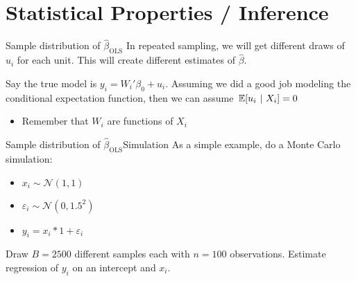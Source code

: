 \documentclass[aspectratio=169,t,11pt,table]{beamer}
\begin{document}
% 



\section{Statistical Properties / Inference}

\begin{frame}{Sample distribution of $\hat{\beta}_{\text{OLS}}$}
  In repeated sampling, we will get different draws of $u_i$ for each unit. This will create different estimates of $\hat{\beta}$. 

  \bigskip
  Say the true model is $y_i = W_i' \beta_0 + u_i$. Assuming we did a good job modeling the conditional expectation function, then we can assume $\expec{u_i}{X_i} = 0$
  \begin{itemize}
    \item Remember that $W_i$ are functions of $X_i$
  \end{itemize}
\end{frame}

\begin{frame}{Sample distribution of $\hat{\beta}_{\text{OLS}}$}{Simulation}
  As a simple example, do a Monte Carlo simulation:
  \begin{itemize}
    \item $x_i \sim \mathcal{N}(1, 1)$
    \item $\varepsilon_i \sim \mathcal{N}(0, 1.5^2)$
    \item $y_i = x_i * 1 + \varepsilon_i$
  \end{itemize} 

  \bigskip
  Draw $B = 2500$ different samples each with $n = 100$ observations. Estimate regression of $y_i$ on an intercept and $x_i$.
\end{frame}

\end{document}
